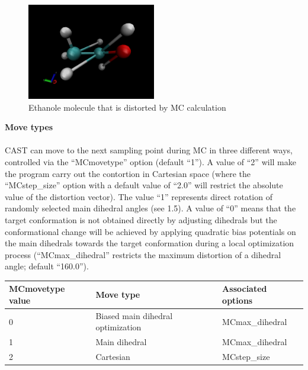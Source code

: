 \documentclass[10pt,a4paper]{article} %
\begin{document}
		\begin{figure}[htb]
		\centering
		\includegraphics[width=0.5\textwidth]{img/distorted_ethanol.png}
		\caption{Ethanole molecule that is distorted by MC calculation}
		\label{fig:dist_eth}
	\end{figure}
	
	\textbf{Move types}\\~\\
	\ac{CAST} can move to the next sampling point during \ac{MC} in three different ways, controlled via the ``MCmovetype'' option (default ``1''). A value of ``2'' will make the program carry out the contortion in Cartesian space (where the ``MCstep\_size'' option with a default value of ``2.0'' will restrict the absolute value of the distortion vector). The value ``1'' represents direct rotation of randomly selected main dihedral angles (see 1.5). A value of ``0'' means that the target conformation is not obtained directly by adjusting dihedrals but the conformational change will be achieved by applying quadratic bias potentials on the main dihedrals towards the target conformation during a local optimization process (``MCmax\_dihedral'' restricts the maximum distortion of a dihedral angle; default ``160.0''). \\
		
	\begin{longtable}{|p{3cm}|p{5cm}|p{3cm}|}
		MCmovetype value & Move type & Associated options \\
		\hline
		0 & Biased main dihedral optimization & MCmax\_dihedral \\
		1 & Main dihedral & MCmax\_dihedral \\
		2 & Cartesian & MCstep\_size \\
	\end{longtable}
\end{document}
